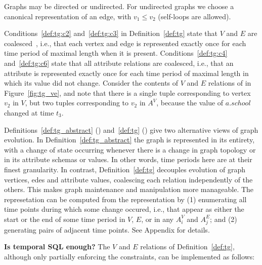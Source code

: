 Graphs may be directed or undirected.  For undirected graphs we choose
a canonical representation of an edge, with $v_1 \leq v_2$ (self-loops
are allowed).

Conditions~\ref{def:tg:c2} and~\ref{def:tg:c3} in
Definition~\ref{def:tg} state that $V$ and $E$ are
coalesced~\cite{DBLP:conf/vldb/BohlenSS96}, i.e., that each vertex and
edge is represented exactly once for each time period of maximal
length when it is present.  Conditions~\ref{def:tg:c4}
and~\ref{def:tg:c6} state that all attribute relations are coalesced,
i.e., that an attribute is represented exactly once for each time
period of maximal length in which its value did not change.  Consider
the contents of $V$ and $E$ relations of  in
Figure~\ref{fig:tg_ve}, and note that there is a single tuple
corresponding to vertex $v_2$ in $V$, but two tuples corresponding to
$v_2$ in $A^{V}$, because the value of $a.school$ changed at time
$t_3$.

Definitions~\ref{def:tg_abstract} (\rgs) and~\ref{def:tg} (\ve) give
two alternative views of graph evolution.  In
Definition~\ref{def:tg_abstract} the graph is represented in its
entirety, with a change of state occurring whenever there is a change
in graph topology or in its attribute schemas or values.  In other
words, time periods here are at their finest granularity.  In
contrast, Definition~\ref{def:tg} decouples evolution of graph
vertices, edes and attribute values, coalescing each relation
independently of the others.  This makes graph maintenance and
manipulation more manageable.  The \rgs represetation can be computed
from the \ve representation by (1) enumerating all time points during
which some change occured, i.e., that appear as either the start or
the end of some time period in $V$, $E$, or in any $A^{V}_i$ and
$A^{E}_j$; and (2) generating pairs of adjacent time points. See
Appendix for details.

{\bf Is temporal SQL enough?} The $V$ and $E$ relations of
Definition~\ref{def:tg}, although only partially enforcing the
constraints, can be implemented as follows:


